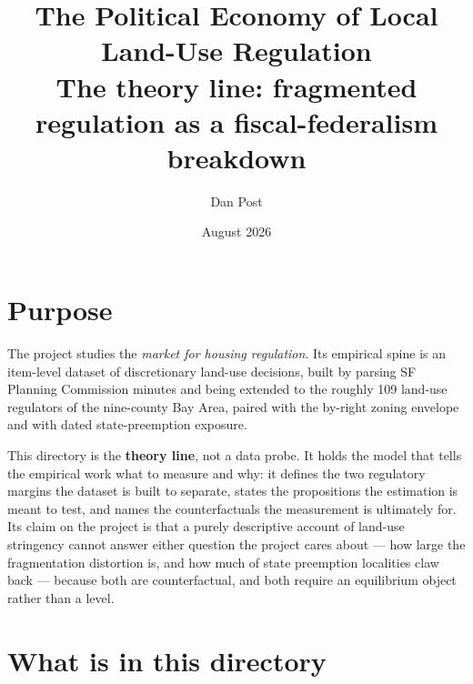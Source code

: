 \documentclass[11pt]{article}
\title{The Political Economy of Local Land-Use Regulation\\
\large The theory line: fragmented regulation as a fiscal-federalism breakdown}
\author{Dan Post}
\date{August 2026}
\begin{document}
\maketitle

\section{Purpose}

The project studies the \emph{market for housing regulation}. Its empirical spine is an item-level
dataset of discretionary land-use decisions, built by parsing SF Planning Commission minutes and
being extended to the roughly 109 land-use regulators of the nine-county Bay Area, paired with the
by-right zoning envelope and with dated state-preemption exposure.

This directory is the \textbf{theory line}, not a data probe. It holds the model that tells the
empirical work what to measure and why: it defines the two regulatory margins the dataset is built
to separate, states the propositions the estimation is meant to test, and names the counterfactuals
the measurement is ultimately for. Its claim on the project is that a purely descriptive account of
land-use stringency cannot answer either question the project cares about --- how large the
fragmentation distortion is, and how much of state preemption localities claw back --- because both
are counterfactual, and both require an equilibrium object rather than a level.

\section{What is in this directory}
\end{document}

